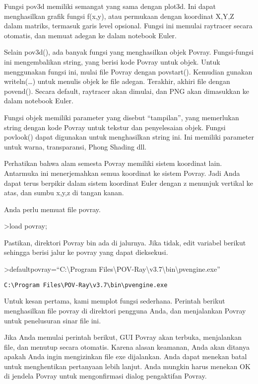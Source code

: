\documentclass[
]{book}
\begin{document}
Fungsi pov3d memiliki semangat yang sama dengan plot3d. Ini dapat menghasilkan grafik fungsi f(x,y), atau permukaan dengan koordinat X,Y,Z dalam matriks, termasuk garis level opsional. Fungsi ini memulai raytracer secara otomatis, dan memuat adegan ke dalam notebook Euler.

Selain pov3d(), ada banyak fungsi yang menghasilkan objek Povray. Fungsi-fungsi ini mengembalikan string, yang berisi kode Povray untuk objek. Untuk menggunakan fungsi ini, mulai file Povray dengan povstart(). Kemudian gunakan writeln(\ldots) untuk menulis objek ke file adegan. Terakhir, akhiri file dengan povend(). Secara default, raytracer akan dimulai, dan PNG akan dimasukkan ke dalam notebook Euler.

Fungsi objek memiliki parameter yang disebut ``tampilan'', yang memerlukan string dengan kode Povray untuk tekstur dan penyelesaian objek. Fungsi povlook() dapat digunakan untuk menghasilkan string ini. Ini memiliki parameter untuk warna, transparansi, Phong Shading dll.

Perhatikan bahwa alam semesta Povray memiliki sistem koordinat lain. Antarmuka ini menerjemahkan semua koordinat ke sistem Povray. Jadi Anda dapat terus berpikir dalam sistem koordinat Euler dengan z menunjuk vertikal ke atas, dan sumbu x,y,z di tangan kanan.

Anda perlu memuat file povray.

\textgreater load povray;

Pastikan, direktori Povray bin ada di jalurnya. Jika tidak, edit variabel berikut sehingga berisi jalur ke povray yang dapat dieksekusi.

\textgreater defaultpovray=``C:\textbackslash Program Files\textbackslash POV-Ray\textbackslash v3.7\textbackslash bin\textbackslash pvengine.exe''

\begin{verbatim}
C:\Program Files\POV-Ray\v3.7\bin\pvengine.exe
\end{verbatim}

Untuk kesan pertama, kami memplot fungsi sederhana. Perintah berikut menghasilkan file povray di direktori pengguna Anda, dan menjalankan Povray untuk penelusuran sinar file ini.

Jika Anda memulai perintah berikut, GUI Povray akan terbuka, menjalankan file, dan menutup secara otomatis. Karena alasan keamanan, Anda akan ditanya apakah Anda ingin mengizinkan file exe dijalankan. Anda dapat menekan batal untuk menghentikan pertanyaan lebih lanjut. Anda mungkin harus menekan OK di jendela Povray untuk mengonfirmasi dialog pengaktifan Povray.
\end{document}

